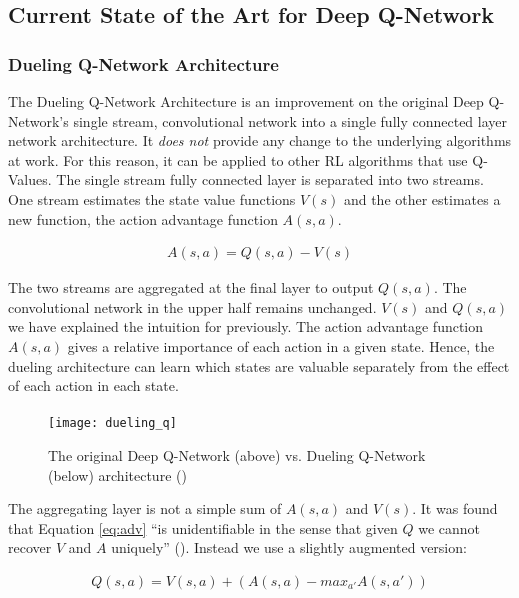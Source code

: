 \subsection{Current State of the Art for Deep Q-Network}
\subsubsection{Dueling Q-Network Architecture}
The Dueling Q-Network Architecture is an improvement on the original Deep Q-Network's single stream, convolutional network into a single fully connected layer network architecture. It \textit{does not} provide any change to the underlying algorithms at work. For this reason, it can be applied to other RL algorithms that use Q-Values. The single stream fully connected layer is separated into two streams. One stream estimates the state value functions $V(s)$ and the other estimates a new function, the action advantage function $A(s, a)$.

\begin{align}
    \label{eq:adv}
    A(s, a) =  Q(s, a) - V(s)
\end{align}

The two streams are aggregated at the final layer to output $Q(s, a)$. The convolutional network in the upper half remains unchanged. $V(s)$ and $Q(s, a)$ we have explained the intuition for previously. The action advantage function $A(s, a)$ gives a relative importance of each action in a given state. Hence, the dueling architecture can learn which states are valuable separately from the effect of each action in each state. \paragraph{}

\begin{figure}[h]
    \centering
    \texttt{[image: dueling\_q]}
    \caption{The original Deep Q-Network (above) vs. Dueling Q-Network (below) architecture (\citet{dueling})}
\end{figure}

The aggregating layer is not a simple sum of $A(s, a)$ and $V(s)$. It was found that Equation \ref{eq:adv} ``is unidentifiable in the sense that given $Q$ we cannot recover $V$ and $A$ uniquely'' (\citet{dueling}). Instead we use a slightly augmented version:

\begin{align}
    Q(s, a) = V(s, a) + (A(s, a) - max_{a'} A(s, a'))
\end{align}

